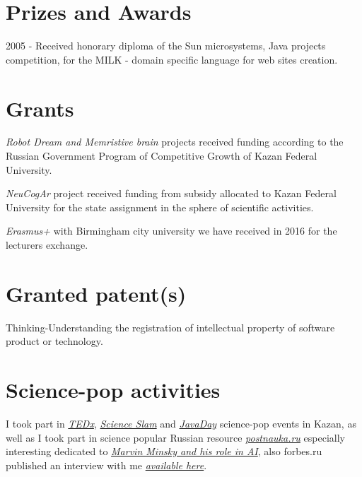 \documentclass{moderncv}
\begin{document}
\section{Prizes and Awards}

2005 - Received honorary diploma of the Sun microsystems, Java projects competition, for the MILK - domain specific language for web sites creation.

\section{Grants}

\emph{Robot Dream and Memristive brain} projects received funding according to the Russian Government Program of Competitive Growth of Kazan Federal University.

\emph{NeuCogAr} project received funding from subsidy allocated to Kazan Federal University for the state assignment in the sphere of scientific activities.

\emph{Erasmus+} with Birmingham city university we have received in 2016 for the lecturers exchange. 

\section{Granted patent(s)}

Thinking-Understanding the registration of intellectual property of software product or technology.

 
\nocite{*}
\printbibliography[title={Papers}]

\cvitem{}{}


\section{Science-pop activities}

I took part in \href{https://www.youtube.com/watch?v=BLvS7h3kRbo}{\emph{TEDx}}, \href{https://vk.com/video-87488544_171504962}{\emph{Science Slam}} and \href{https://www.youtube.com/watch?v=sLLKxvUEA7E}{\emph{JavaDay}} science-pop events in Kazan, as well as I took part in science popular Russian resource \href{https://postnauka.ru/author/talanov}{\emph{postnauka.ru}} especially interesting dedicated to \href{https://postnauka.ru/faq/58727}{\emph{Marvin Minsky and his role in AI}}, also forbes.ru published an interview with me \href{http://www.forbes.ru/mneniya-column/288097-kak-sozdat-emotsionalnyi-iskusstvennyi-intellekt}{\emph{available here}}.
\end{document}
